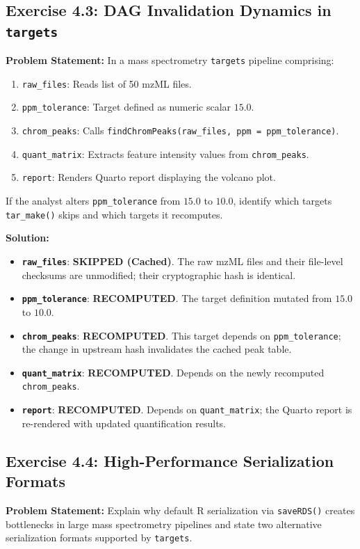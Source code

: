 \documentclass[11pt,twoside,openright]{book}
\begin{document}
\subsection*{Exercise 4.3: DAG Invalidation Dynamics in \texttt{targets}}
\noindent\textbf{Problem Statement:}\enspace
In a mass spectrometry \texttt{targets} pipeline comprising:
\begin{enumerate}
\item \texttt{raw\_files}: Reads list of 50 mzML files.
\item \texttt{ppm\_tolerance}: Target defined as numeric scalar $15.0$.
\item \texttt{chrom\_peaks}: Calls \texttt{findChromPeaks(raw\_files, ppm = ppm\_tolerance)}.
\item \texttt{quant\_matrix}: Extracts feature intensity values from \texttt{chrom\_peaks}.
\item \texttt{report}: Renders Quarto report displaying the volcano plot.
\end{enumerate}
If the analyst alters \texttt{ppm\_tolerance} from $15.0$ to $10.0$, identify which targets \texttt{tar\_make()} skips and which targets it recomputes.

\noindent\textbf{Solution:}\enspace
\begin{itemize}
\item \textbf{\texttt{raw\_files}}: \textbf{SKIPPED (Cached)}. The raw mzML files and their file-level checksums are unmodified; their cryptographic hash is identical.
\item \textbf{\texttt{ppm\_tolerance}}: \textbf{RECOMPUTED}. The target definition mutated from $15.0$ to $10.0$.
\item \textbf{\texttt{chrom\_peaks}}: \textbf{RECOMPUTED}. This target depends on \texttt{ppm\_tolerance}; the change in upstream hash invalidates the cached peak table.
\item \textbf{\texttt{quant\_matrix}}: \textbf{RECOMPUTED}. Depends on the newly recomputed \texttt{chrom\_peaks}.
\item \textbf{\texttt{report}}: \textbf{RECOMPUTED}. Depends on \texttt{quant\_matrix}; the Quarto report is re-rendered with updated quantification results.
\end{itemize}

\subsection*{Exercise 4.4: High-Performance Serialization Formats}
\noindent\textbf{Problem Statement:}\enspace
Explain why default R serialization via \texttt{saveRDS()} creates bottlenecks in large mass spectrometry pipelines and state two alternative serialization formats supported by \texttt{targets}.
\end{document}
